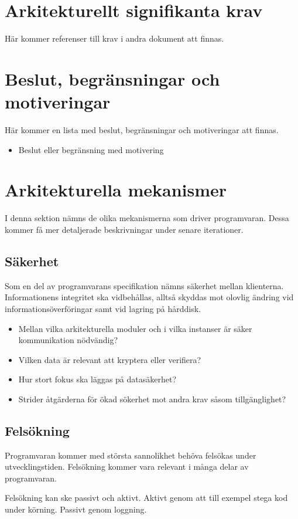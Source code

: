 \section{Arkitekturellt signifikanta krav}
Här kommer referenser till krav i andra dokument att finnas.
\section{Beslut, begränsningar och motiveringar}
Här kommer en lista med beslut, begränsningar och motiveringar att finnas.
\begin{itemize}
\item Beslut eller begränsning med motivering
\end{itemize}
\section{Arkitekturella mekanismer}
I denna sektion nämns de olika mekanismerna som driver programvaran. Dessa kommer få mer detaljerade beskrivningar under senare iterationer.
\subsection{Säkerhet}
Som en del av programvarans specifikation nämns säkerhet mellan klienterna. Informationens integritet ska vidbehållas, alltså skyddas mot olovlig ändring vid informationsöverföringar samt vid lagring på hårddisk.

\begin{itemize}
\item Mellan vilka arkitekturella moduler och i vilka instanser är säker kommunikation nödvändig?
\item Vilken data är relevant att kryptera eller verifiera?
\item Hur stort fokus ska läggas på datasäkerhet?
\item Strider åtgärderna för ökad sökerhet mot andra krav såsom tillgänglighet?
\end{itemize}
\subsection{Felsökning}
Programvaran kommer med största sannolikhet behöva felsökas under utvecklingstiden. Felsökning kommer vara relevant i många delar av programvaran.

Felsökning kan ske passivt och aktivt. Aktivt genom att till exempel stega kod under körning. Passivt genom loggning.

